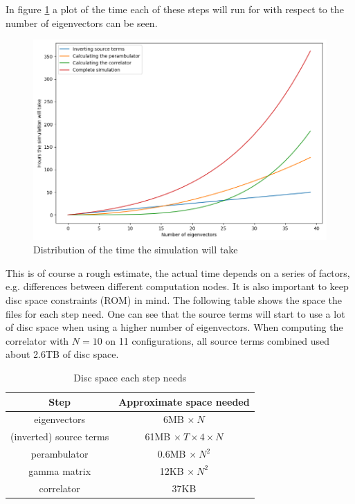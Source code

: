 In figure \ref{time_of_sim} a plot of the time each of these steps will run for with respect to the number of eigenvectors can be seen.

\begin{figure}[H]
        \centering
        \includegraphics[width=1\textwidth]{images/time_of_sim.png}
        \caption{Distribution of the time the simulation will take}
        \label{time_of_sim}
    \end{figure}

\noindent
This is of course a rough estimate, the actual time depends on a series of factors, e.g. differences between different computation nodes. It is also important to keep disc space constraints (ROM) in mind. The following table shows the space the files for each step need. One can see that the source terms will start to use a lot of disc space when using a higher number of eigenvectors. When computing the correlator with $N = 10$ on 11 configurations, all source terms combined used about 2.6TB of disc space.

\begin{table}[h]
            \centering
            \begin{tabular}{|c|c|}
            \hline
            \multicolumn{1}{|c|}{Step} & \multicolumn{1}{c|}{Approximate space needed} \\ \hline
             eigenvectors & 6MB $\times\ N$\\
             (inverted) source terms & 61MB $\times\ T \times 4 \times N$\\
             perambulator & 0.6MB $\times\ N^2$\\
             gamma matrix & 12KB $\times\ N^2$\\
             correlator & 37KB\\
              \hline
            \end{tabular}
            \caption{Disc space each step needs}
            \label{disc_space}
        \end{table}

